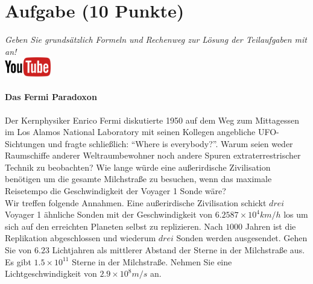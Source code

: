 \documentclass[a4paper, 9pt]{scrartcl}\usepackage[]{graphicx}\usepackage[]{xcolor}
\begin{document}
\section{Aufgabe \hfill (10 Punkte)}

\textit{Geben Sie grunds{\"a}tzlich Formeln und Rechenweg zur L{\"o}sung der
  Teilaufgaben mit an!} \\[1Ex]

\hfill\href{https://youtu.be/iCQogS6KhPM}{\includegraphics[width =
  2cm]{img/youtube}} %
\hspace{2Ex}

\paragraph{Das Fermi Paradoxon}



Der Kernphysiker Enrico Fermi diskutierte 1950 auf dem Weg zum Mittagessen
im Los Alamos National Laboratory mit seinen Kollegen angebliche
UFO-Sichtungen und fragte schlie{\ss}lich: "`Where is everybody?"'. Warum seien
weder Raumschiffe anderer Weltraumbewohner noch andere Spuren
extraterrestrischer Technik zu beobachten? Wie lange w{\"u}rde eine au{\ss}erirdische
Zivilisation ben{\"o}tigen um die gesamte Milchstra{\ss}e zu
besuchen, wenn das maximale Reisetempo die Geschwindigkeit der Voyager 1 Sonde w{\"a}re?\\[-1ex]

Wir treffen folgende Annahmen. Eine au{\ss}erirdische Zivilisation schickt $drei$
Voyager 1 {\"a}hnliche Sonden mit der Geschwindigkeit von $\ensuremath{6.2587\times 10^{4}}km/h$
los um sich auf den erreichten Planeten selbst zu replizieren. Nach
$1000$ Jahren ist die Replikation abgeschlossen und wiederum
$drei$ Sonden werden ausgesendet. Gehen Sie von
$6.23$ Lichtjahren als mittlerer Abstand der Sterne in der
Milchstra{\ss}e aus. Es gibt $\ensuremath{1.5\times 10^{11}}$ Sterne in der Milchstra{\ss}e. Nehmen
Sie eine Lichtgeschwindigkeit von $\ensuremath{2.9\times 10^{8}}m/s$ an.
\end{document}
